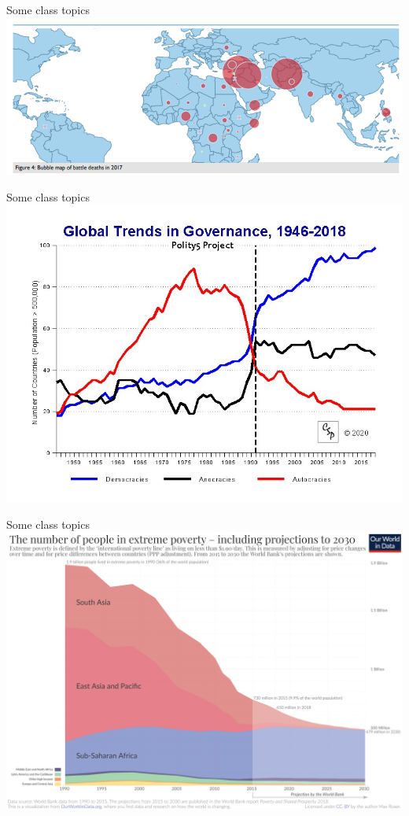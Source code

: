 \documentclass{beamer}
\begin{document}
\begin{frame}{\LARGE Some class topics}  %
\includegraphics[width=\textwidth]{battle deaths.png}
\end{frame}

\begin{frame}{\LARGE Some class topics}
\centering
\includegraphics[width=\textwidth,height=0.8\textheight,keepaspectratio]{Global trends governance.jpg}
\end{frame}

\begin{frame}{\LARGE Some class topics}
\centering
\includegraphics[width=\textwidth,height=0.8\textheight,keepaspectratio]{Extreme-Poverty-projection-by-the-World-Bank-to-2030.png}
\end{frame}
\end{document}
